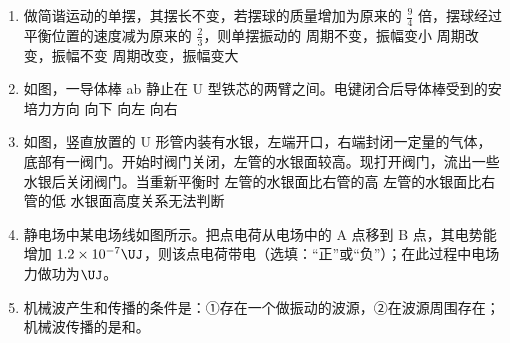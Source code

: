 \documentclass[\gkver]{gaokaozhenti}
\begin{document}
\begin{enumerate}
\item
做简谐运动的单摆，其摆长不变，若摆球的质量增加为原来的 $\frac{9}{4}$ 倍，摆球经过平衡位置的速度减为原来的 $\frac{2}{3}$，则单摆振动的
{周期不变，振幅变小}
{周期改变，振幅不变}
{周期改变，振幅变大}

\item
如图，一导体棒 ab 静止在 U 型铁芯的两臂之间。电键闭合后导体棒受到的安培力方向
\onepicture[align=right, w=6.14cm]{}
{向下}
{向左}
{向右}

\item
如图，竖直放置的 U 形管内装有水银，左端开口，右端封闭一定量的气体，底部有一阀门。开始时阀门关闭，左管的水银面较高。现打开阀门，流出一些水银后关闭阀门。当重新平衡时
\onepicture[align=right, h=2.98cm]{}
{左管的水银面比右管的高}
{左管的水银面比右管的低}
{水银面高度关系无法判断}

\item
静电场中某电场线如图所示。把点电荷从电场中的 A 点移到 B 点，其电势能增加 $1.2\times10^{-7}\UJ$，则该点电荷带电（选填：“正”或“负”）；在此过程中电场力做功为$\UJ$。
\onepicture[align=right, w=3.45cm]{}

\item
机械波产生和传播的条件是：①存在一个做振动的波源，②在波源周围存在；机械波传播的是和。


\end{enumerate}
\end{document}
